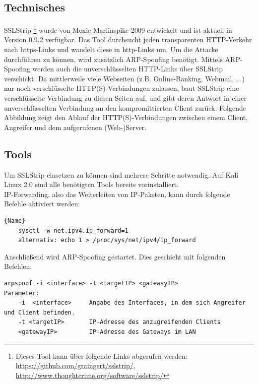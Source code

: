 \subsection*{Technisches}
SSLStrip \footnote{ Dieses Tool kann über folgende Links abgerufen werden: \url{https://github.com/graingert/sslstrip/}, \url{http://www.thoughtcrime.org/software/sslstrip/}} wurde von Moxie Marlinspike 2009 entwickelt und ist aktuell in Version 0.9.2 verfügbar. Das Tool durchsucht jeden transparenten HTTP-Verkehr nach https-Links und wandelt diese in http-Links um. Um die Attacke durchführen zu können, wird zusätzlich ARP-Spoofing benötigt. Mittels ARP-Spoofing werden auch die unverschlüsselten HTTP-Links über SSLStrip verschickt. Da mittlerweile viele Webseiten (z.B. Online-Banking, Webmail, ...) nur noch verschlüsselte HTTP(S)-Verbindungen zulassen, baut SSLStrip eine verschlüsselte Verbindung zu diesen Seiten auf, und gibt deren Antwort in einer unverschlüsselten Verbindung an den kompromittierten Client zurück. Folgende Abbildung zeigt den Ablauf der HTTP(S)-Verbindungen zwischen einem Client, Angreifer und dem aufgerufenen (Web-)Server. \\

\subsection*{Tools}
Um SSLStrip einsetzen zu können sind mehrere Schritte notwendig. Auf Kali Linux 2.0 sind alle benötigten Tools bereits vorinstalliert. \\

IP-Forwarding, also das Weiterleiten von IP-Paketen, kann durch folgende Befehle aktiviert werden:\\

\begin{lstlisting}[caption=Aktivieren von IP-Forwarding]{Name}
	sysctl -w net.ipv4.ip_forward=1
	alternativ: echo 1 > /proc/sys/net/ipv4/ip_forward
\end{lstlisting}
	

Anschließend wird ARP-Spoofing gestartet. Dies geschieht mit folgenden Befehlen:
\begin{lstlisting}[caption=Parameter für ARP-Spoofing]
arpspoof -i <interface> -t <targetIP> <gatewayIP>
Parameter:
	-i  <interface>		Angabe des Interfaces, in dem sich Angreifer und Client befinden.
	-t <targetIP>   	IP-Adresse des anzugreifenden Clients
	<gatewayIP>   		IP-Adresse des Gateways im LAN
\end{lstlisting}

